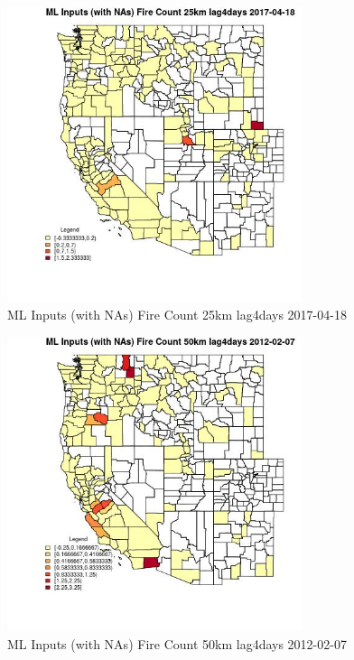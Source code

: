 \begin{figure} 
\centering  
\includegraphics[width=0.77\textwidth]{Code_Outputs/Report_ML_input_PM25_Step4_part_f_de_duplicated_aves_prioritize_24hr_obswNAs_CountyFire_Count_25km_lag4daysMean2017-04-18.jpg} 
\caption{\label{fig:Report_ML_input_PM25_Step4_part_f_de_duplicated_aves_prioritize_24hr_obswNAsCountyFire_Count_25km_lag4daysMean2017-04-18}ML Inputs (with NAs) Fire Count 25km lag4days 2017-04-18} 
\end{figure} 
 

\begin{figure} 
\centering  
\includegraphics[width=0.77\textwidth]{Code_Outputs/Report_ML_input_PM25_Step4_part_f_de_duplicated_aves_prioritize_24hr_obswNAs_CountyFire_Count_50km_lag4daysMean2012-02-07.jpg} 
\caption{\label{fig:Report_ML_input_PM25_Step4_part_f_de_duplicated_aves_prioritize_24hr_obswNAsCountyFire_Count_50km_lag4daysMean2012-02-07}ML Inputs (with NAs) Fire Count 50km lag4days 2012-02-07} 
\end{figure} 
 

